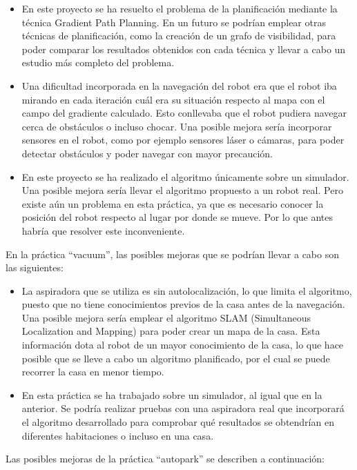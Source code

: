 \begin{itemize}
\item En este proyecto se ha resuelto el problema de la planificación mediante la técnica Gradient Path Planning. En un futuro se podrían emplear otras técnicas de planificación, como la creación de un grafo de visibilidad, para poder comparar los resultados obtenidos con cada técnica y llevar a cabo un estudio más completo del problema.
\item Una dificultad incorporada en la navegación del robot era que el robot iba mirando en cada iteración cuál era su situación respecto al mapa con el campo del gradiente calculado. Esto conllevaba que el robot pudiera navegar cerca de obstáculos o incluso chocar. Una posible mejora sería incorporar sensores en el robot, como por ejemplo sensores láser o cámaras, para poder detectar obstáculos y poder navegar con mayor precaución.
\item En este proyecto se ha realizado el algoritmo únicamente sobre un simulador. Una posible mejora sería llevar el algoritmo propuesto a un robot real. Pero existe aún un problema en esta práctica, ya que es necesario conocer la posición del robot respecto al lugar por donde se mueve. Por lo que antes habría que resolver este inconveniente.
\end{itemize}

En la práctica ``vacuum'', las posibles mejoras que se podrían llevar a cabo son las siguientes:

\begin{itemize}
\item La aspiradora que se utiliza es sin autolocalización, lo que limita el algoritmo, puesto que no tiene conocimientos previos de la casa antes de la navegación. Una posible mejora sería emplear el algoritmo SLAM (Simultaneous Localization and Mapping) para poder crear un mapa de la casa. Esta información dota al robot de un mayor conocimiento de la casa, lo que hace posible que se lleve a cabo un algoritmo planificado, por el cual se puede recorrer la casa en menor tiempo.\\
\item En esta práctica se ha trabajado sobre un simulador, al igual que en la anterior. Se podría realizar pruebas con una aspiradora real que incorporará el algoritmo desarrollado para comprobar qué resultados se obtendrían en diferentes habitaciones o incluso en una casa.
\end{itemize}

Las posibles mejoras de la práctica ``autopark'' se describen a continuación:

